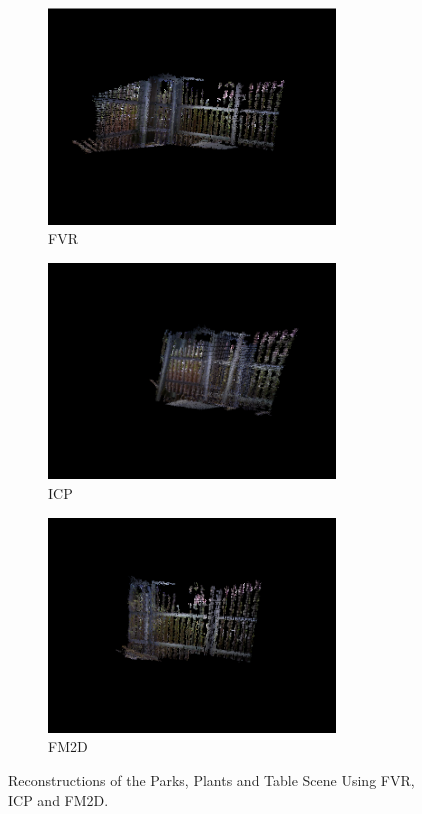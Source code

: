 \begin{figure}[!htb] 
        \centering
        \begin{subfigure}[b]{3.0in}
                \includegraphics[width=3.0in]{images/results/qualitative_fvr_sota/plants_outdoors_FVR}
                \caption{FVR}
                \label{fig:qualrecon2FVR}
        \end{subfigure}
        \begin{subfigure}[b]{3.0in}
                \includegraphics[width=3.0in]{images/results/qualitative_fvr_sota/plants_outdoors_ICP}
                \caption{ICP}
                \label{fig:qualrecon2ICP}
        \end{subfigure}
        \begin{subfigure}[b]{3.0in}
                \includegraphics[width=3.0in]{images/results/qualitative_fvr_sota/plants_outdoors_FM2D}
                \caption{FM2D}
                \label{fig:qualrecon2FM2D}
        \end{subfigure}
       \caption{Reconstructions of the Parks, Plants and Table Scene Using FVR, ICP and FM2D.}
       \label{fig:QualReconstructions2}
\end{figure}

